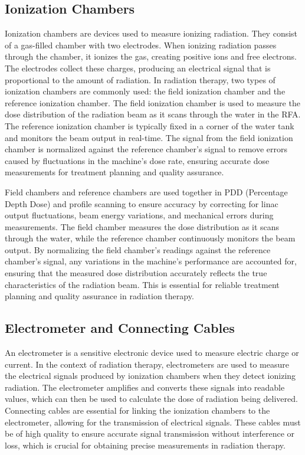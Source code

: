 \subsection{Ionization Chambers}
Ionization chambers are devices used to measure ionizing radiation. They consist of a gas-filled chamber with two electrodes. When ionizing radiation passes through the chamber, it ionizes the gas, creating positive ions and free electrons. The electrodes collect these charges, producing an electrical signal that is proportional to the amount of radiation. In radiation therapy, two types of ionization chambers are commonly used: the field ionization chamber and the reference ionization chamber. The field ionization chamber is used to measure the dose distribution of the radiation beam as it scans through the water in the RFA. The reference ionization chamber is typically fixed in a corner of the water tank and monitors the beam output in real-time. The signal from the field ionization chamber is normalized against the reference chamber's signal to remove errors caused by fluctuations in the machine's dose rate, ensuring accurate dose measurements for treatment planning and quality assurance. 

Field chambers and reference chambers are used together in PDD (Percentage Depth Dose) and profile scanning to ensure accuracy by correcting for linac output fluctuations, beam energy variations, and mechanical errors during measurements. The field chamber measures the dose distribution as it scans through the water, while the reference chamber continuously monitors the beam output. By normalizing the field chamber's readings against the reference chamber's signal, any variations in the machine's performance are accounted for, ensuring that the measured dose distribution accurately reflects the true characteristics of the radiation beam. This is essential for reliable treatment planning and quality assurance in radiation therapy.
\subsection{Electrometer and Connecting Cables}
An electrometer is a sensitive electronic device used to measure electric charge or current. In the context of radiation therapy, electrometers are used to measure the electrical signals produced by ionization chambers when they detect ionizing radiation. The electrometer amplifies and converts these signals into readable values, which can then be used to calculate the dose of radiation being delivered. Connecting cables are essential for linking the ionization chambers to the electrometer, allowing for the transmission of electrical signals. These cables must be of high quality to ensure accurate signal transmission without interference or loss, which is crucial for obtaining precise measurements in radiation therapy.
